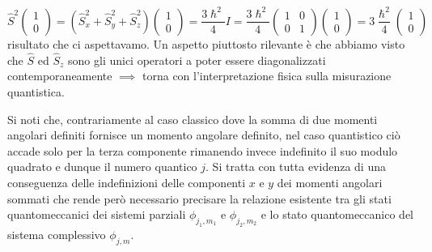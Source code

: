 \[
	\hat{S}^{2}
	\begin{pmatrix}
		1 \\
		0
	\end{pmatrix}
	= (\hat{S}_{x}^{2} + \hat{S}_{y}^{2}+\hat{S}_{z}^{2})\begin{pmatrix}
		1 \\
		0
	\end{pmatrix} = \frac{3 \hslash^{2}}{4} I = \frac{3\hslash^{2}}{4} \begin{pmatrix}
		1 & 0 \\
		0 & 1
	\end{pmatrix}\begin{pmatrix}
		1 \\
		0
	\end{pmatrix}
	= 3 \frac{\hslash^{2}}{4} \begin{pmatrix}
		1 \\
		0
	\end{pmatrix}
\] risultato che ci aspettavamo.
Un aspetto piuttosto rilevante è che
abbiamo visto che \(\hat{S}\) ed \(\hat{S}_{z}\) sono gli unici
operatori a poter essere diagonalizzati contemporaneamente \(\implies\)
torna con l'interpretazione fisica sulla misurazione quantistica.
\bigskip

Si noti che, contrariamente al caso classico dove la somma di due
momenti angolari definiti fornisce un momento angolare definito, nel
caso quantistico ciò accade solo per la terza componente rimanendo
invece indefinito il suo modulo quadrato e dunque il numero quantico
\(j\).
Si tratta con tutta evidenza di una conseguenza delle
indefinizioni delle componenti \(x\) e \(y\) dei momenti angolari
sommati che rende però necessario precisare la relazione esistente tra
gli stati quantomeccanici dei sistemi parziali \(\phi_{j_1, m_1}\) e
\(\phi_{j_2,m_2}\) e lo stato quantomeccanico del sistema complessivo
\(\phi_{j,m}\).

